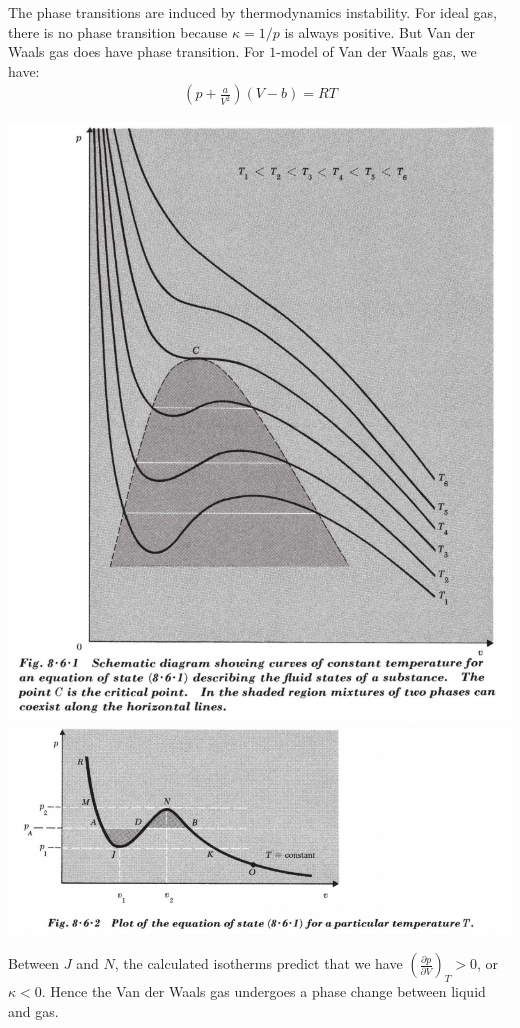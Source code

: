 \documentclass[11pt,oneside]{book}
\theoremstyle{break}
\theoremstyle{break}
\newcommand{\lr}[1]{\left( #1 \right)}
\begin{document}
The phase transitions are induced by thermodynamics instability. For ideal gas, there is no phase transition because $\kappa = 1/p$ is always positive. But Van der Waals gas does have phase transition. For $1$-model of Van der Waals gas, we have:
\begin{align*}
\left( p + \frac{a}{V^2}\right) (V-b) = RT
\end{align*}
\hfill\break\hfill\break
\begin{center}
\includegraphics[scale=0.69]{phase1.png}\\
\includegraphics[scale=0.69]{phase2.png}
\end{center}
Between $J$ and $N$, the calculated isotherms predict that we have $\lr{\frac{\partial p}{\partial V}}_T >0$, or $\kappa <0$. Hence the Van der Waals gas undergoes a phase change between liquid and gas.\\
\end{document}
